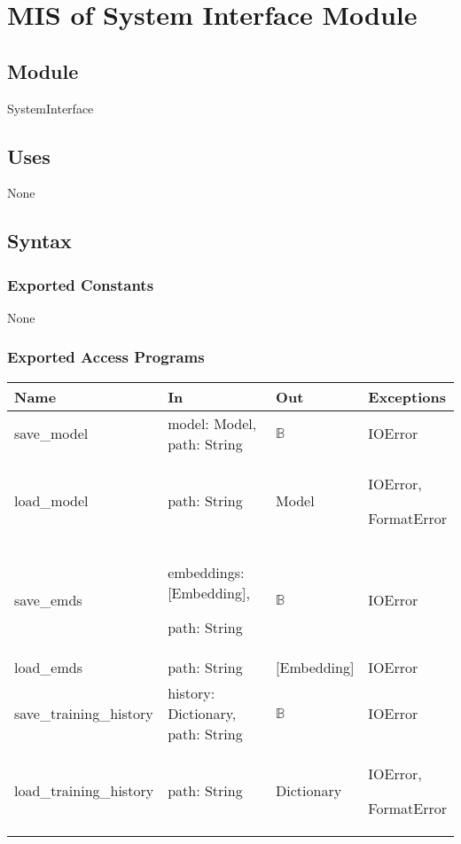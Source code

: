 \documentclass[12pt, titlepage]{article}
\begin{document}
\newpage


\section{MIS of System Interface Module} \label{ModuleHH}

\subsection{Module}

SystemInterface

\subsection{Uses}
None

\subsection{Syntax}

\subsubsection{Exported Constants}
None
\subsubsection{Exported Access Programs}

\begin{center}
\begin{tabular}{p{4cm} p{4cm} p{4cm} p{2cm}}
\hline
\textbf{Name} & \textbf{In} & \textbf{Out} & \textbf{Exceptions} \\
\hline
save\_model & model: Model, path: String & $\mathbb{B}$ & IOError \\
\hline
load\_model & path: String &  Model & IOError,

FormatError \\
\hline
save\_emds & embeddings: [Embedding],

path: String &  $\mathbb{B}$ & IOError \\
\hline
load\_emds & path: String &  [Embedding] & IOError \\
\hline


save\_training\_history & history: Dictionary, path: String & $\mathbb{B}$ & IOError \\
\hline
load\_training\_history & path: String & Dictionary & IOError, 

FormatError \\
\hline
\end{tabular}
\end{center}
\end{document}
